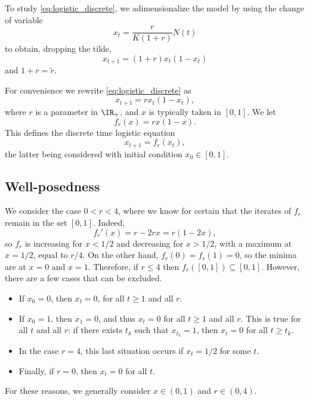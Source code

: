 To study \eqref{eq:logistic_discrete}, we adimensionalize the model by using the change of variable
\[
x_t=\frac{r}{K(1+r)}N(t)
\] 
to obtain, dropping the tilde,
$$x_{t+1}=(1+r)x_t(1-x_t)$$
and $1+r=\tilde r$.


For convenience we rewrite \eqref{eq:logistic_discrete} as
\begin{equation}\label{eq:logistic_discrete_scaled}
x_{t+1}=rx_t(1-x_t),
\end{equation}
where $r$ is a parameter in $\IR_+$, and $x$ is typically taken in $[0,1]$. We let
\begin{equation}\label{eq:logistic_map}
f_r(x)=rx(1-x).
\end{equation}
This defines the discrete time logistic equation
\begin{equation}
x_{t+1}=f_r(x_t), \label{eq:logistic}
\end{equation}
the latter being considered with initial condition $x_0\in[0,1]$.

\subsection{Well-posedness}
We consider the case $0<r<4$, where we know for certain that the iterates of $f_r$ remain in the set $[0,1]$. Indeed, 
\begin{equation}\label{eq:dlogistic_map}
f_r'(x)=r-2r x=r(1-2x),
\end{equation}
so $f_r$ is increasing for $x<1/2$ and decreasing for $x>1/2$, with a maximum at $x=1/2$, equal to $r/4$. On the other hand, $f_r(0)=f_r(1)=0$, so the minima are at $x=0$ and $x=1$. Therefore, if $r\leq 4$ then $f_r([0,1])\subseteq[0,1]$.
However, there are a few cases that can be excluded.
\begin{itemize}
\item If $x_0=0$, then $x_t=0$, for all $t\geq 1$ and all $r$.
\item If $x_0=1$, then $x_1=0$, and thus $x_t=0$ for all $t\geq 1$ and all $r$.
This is true for all $t$ and all $r$: if there exists $t_k$ such that $x_{t_k}=1$, then $x_t=0$ for all $t\geq t_k$.
\item In the case $r=4$, this last situation occurs if $x_t=1/2$ for some $t$.
\item Finally, if $r=0$, then $x_t=0$ for all $t$.
\end{itemize}
For these reasons, we generally consider $x\in(0,1)$
and $r\in(0,4)$.






